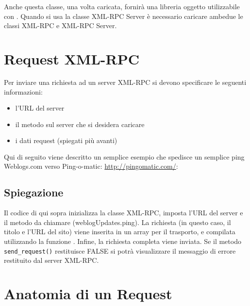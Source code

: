Anche questa classe, una volta caricata, fornirà una libreria oggetto utilizzabile con . Quando si usa la classe XML-RPC Server è necessario caricare ambedue le classi XML-RPC e XML-RPC Server.

\section*{Request XML-RPC}

Per inviare una richiesta ad un server XML-RPC si devono specificare le seguenti informazioni:

\begin{itemize}
\item l'URL del server
\item il metodo sul server che si desidera caricare
\item i dati request (spiegati più avanti)
\end{itemize}

Qui di seguito viene descritto un semplice esempio che spedisce un semplice ping Weblogs.com verso Ping-o-matic: \url{http://pingomatic.com/}:


\subsection*{Spiegazione}

Il codice di qui sopra inizializza la classe XML-RPC, imposta l'URL del server e il metodo da chiamare (weblogUpdates.ping). La richiesta (in questo caso, il titolo e l'URL del sito) viene inserita in un array per il trasporto, e compilata utilizzando la funzione . Infine, la richiesta completa viene inviata. Se il metodo \verb|send_request()| restituisce FALSE si potrà visualizzare il messaggio di errore restituito dal server XML-RPC.

\section*{Anatomia di un Request}

